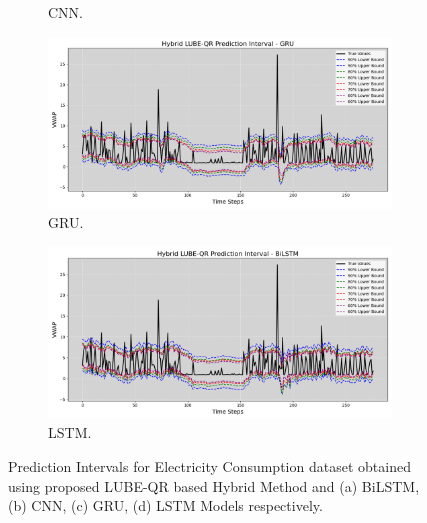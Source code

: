\begin{figure}[H]
\begin{minipage}{0.49\textwidth}
\begin{subfigure}[b]{\textwidth}
            \caption{CNN.}
        \end{subfigure}
        \begin{subfigure}[b]{\textwidth}
            \centering
            \includegraphics[width=\textwidth]{Chap03/figs/Hybrid_LUBE_QR_AllConfidence_elec_consumption_GRU.png}
            \caption{GRU.}
        \end{subfigure}
        \begin{subfigure}[b]{\textwidth}
            \centering
            \includegraphics[width=\textwidth]{Chap03/figs/Hybrid_LUBE_QR_AllConfidence_elec_consumption_BiLSTM.png}
            \caption{LSTM.}
        \end{subfigure}
        \caption{Prediction Intervals for Electricity Consumption dataset obtained using proposed LUBE-QR based Hybrid Method and (a) BiLSTM, (b) CNN, (c) GRU, (d) LSTM Models respectively.}
        \label{fig 5.4}
    \end{minipage}
\end{figure}

